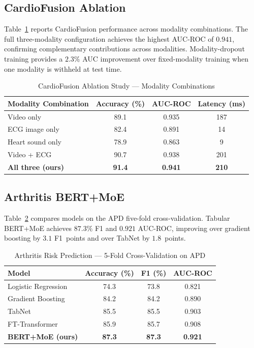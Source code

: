 \documentclass[journal,10pt,twoside]{IEEEtran}
\begin{document}
\subsection{CardioFusion Ablation}

Table~\ref{tab:cardiofusion} reports CardioFusion performance across modality
combinations.
The full three-modality configuration achieves the highest AUC-ROC of $0.941$,
confirming complementary contributions across modalities.
Modality-dropout training provides a $2.3\%$ AUC improvement over fixed-modality
training when one modality is withheld at test time.

\begin{table}[!t]
  \caption{CardioFusion Ablation Study — Modality Combinations}
  \label{tab:cardiofusion}
  \centering
  \renewcommand{\arraystretch}{1.2}
  \begin{tabular}{lccc}
    \toprule
    \textbf{Modality Combination} & \textbf{Accuracy (\%)} & \textbf{AUC-ROC} &
    \textbf{Latency (ms)} \\
    \midrule
    Video only              & 89.1 & 0.935 & 187 \\
    ECG image only          & 82.4 & 0.891 &  14 \\
    Heart sound only        & 78.9 & 0.863 &   9 \\
    Video + ECG             & 90.7 & 0.938 & 201 \\
    \textbf{All three (ours)} & \textbf{91.4} & \textbf{0.941} & \textbf{210} \\
    \bottomrule
  \end{tabular}
\end{table}

\subsection{Arthritis BERT+MoE}

Table~\ref{tab:arthritis} compares models on the APD five-fold cross-validation.
Tabular BERT+MoE achieves $87.3\%$ F1 and $0.921$ AUC-ROC, improving over gradient
boosting by $3.1$ F1~points and over TabNet by $1.8$~points.

\begin{table}[!t]
  \caption{Arthritis Risk Prediction — 5-Fold Cross-Validation on APD}
  \label{tab:arthritis}
  \centering
  \renewcommand{\arraystretch}{1.2}
  \begin{tabular}{lccc}
    \toprule
    \textbf{Model} & \textbf{Accuracy (\%)} & \textbf{F1 (\%)} & \textbf{AUC-ROC} \\
    \midrule
    Logistic Regression        & 74.3 & 73.8 & 0.821 \\
    Gradient Boosting          & 84.2 & 84.2 & 0.890 \\
    TabNet~\cite{arik2021}     & 85.5 & 85.5 & 0.903 \\
    FT-Transformer~\cite{gorishniy2021} & 85.9 & 85.7 & 0.908 \\
    \textbf{BERT+MoE (ours)}   & \textbf{87.3} & \textbf{87.3} & \textbf{0.921} \\
    \bottomrule
  \end{tabular}
\end{table}
\end{document}
